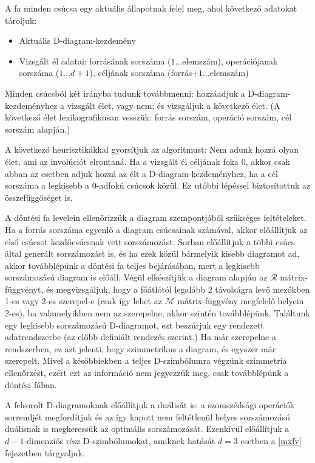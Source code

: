 \documentclass[12pt,magyar,a4paper]{article}
\begin{document}
A fa minden csúcsa egy aktuális állapotnak felel meg, ahol
következő adatokat tároljuk:
\begin{itemize}
  \item Aktuális D-diagram-kezdemény
  \item Vizsgált él adatai: forrásának sorszáma ($1\ldots$elemszám),
    operációjanak sorszáma ($1\ldots d+1$), céljának sorszáma
    (forrás$+1\ldots$elemszám)
\end{itemize}

Minden csúcsból két irányba tudunk továbbmenni: hozzáadjuk a
D-diagram-kezdeményhez a vizsgált élet, vagy nem; és vizsgáljuk a
következő élet. (A következő élet lexikografikusan vesszük: forrás
sorszám, operáció sorszám, cél sorszám alapján.) 

A következő heurisztikákkal gyorsítjuk az algoritmust: Nem adunk hozzá olyan
élet, ami az involúciót elrontaná. Ha a vizsgált él céljának foka $0$, akkor
csak abban az esetben adjuk hozzá az élt a D-diagram-kezdeményhez, ha a cél
sorszáma a legkisebb a $0$-adfokú csúcsok közül. Ez utóbbi lépéssel
biztosítottuk az összefüggőséget is.

A döntési fa levelein ellenőrizzük a diagram szempontjából szükséges
feltételeket. Ha a forrás sorszáma egyenlő a diagram csúcsainak számával, akkor
előállítjuk az első csúcsot kezdőcsúcsnak vett sorszámozást. Sorban előállítjuk
a többi csúcs által generált sorszámozást is, és ha ezek közül bármelyik kisebb
diagramot ad, akkor továbblépünk a döntési fa teljes bejárásában, mert a
legkisebb sorszámozású diagram is előáll. Végül elkészítjük a diagram alapján az
$\mathcal{R}$ mátrix-függvényt, és megvizsgáljuk, hogy a főátlótól legalább $2$
távolságra levő mezőkben 1-es vagy 2-es szerepel-e (csak így lehet az
$\mathcal{M}$ mátrix-függvény megfelelő helyein 2-es), ha valamelyikben nem az
szerepelne, akkor szintén továbblépünk. Találtunk egy legkisebb sorszámozású
D-diagramot, ezt beszúrjuk egy rendezett adatrendszerbe (az előbb definiált
rendezés szerint.) Ha már szerepelne a rendszerben, ez azt jelenti, hogy
szimmetrikus a diagram, és egyszer már szerepelt. Mivel a későbbiekben a teljes
D-szimbólumra végzünk szimmetria ellenőrzést, ezért ezt az információ nem
jegyezzük meg, csak továbblépünk a döntési fában.

A felsorolt D-diagramoknak előállítjuk a duálisát is: a szomszédsági operációk
sorrendjét megfordítjuk és az így kapott nem feltétlenül helyes sorszámozású
duálisnak is megkeressük az optimális sorszámozását. Ezenkívül előállítjuk a
$d-1$-dimenziós rész D-szimbólumokat, amiknek hatását $d=3$ esetben a \ref{mxfv}
fejezetben tárgyaljuk.
\end{document}
